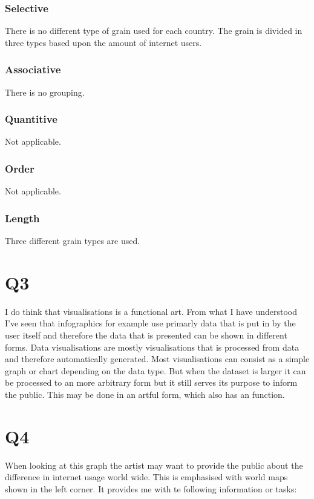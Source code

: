 \documentclass[11pt,a4paper]{article}
\begin{document}
\subsubsection{Selective}
There is no different type of grain used for each country. The grain is divided in three types based upon the amount of internet users. 
\subsubsection{Associative}
There is no grouping.
\subsubsection{Quantitive}
Not applicable.
\subsubsection{Order}
Not applicable.
\subsubsection{Length}
Three different grain types are used.

\section{Q3}
I do think that visualisations is a functional art. From what I have understood I've seen that infographics for example use primarly data that is put in by the user itself and therefore the data that is presented can be shown in different forms. Data visualisations are mostly visualisations that is processed from data and therefore automatically generated. Most visualisations can consist as a simple graph or chart depending on the data type. But when the dataset is larger it can be processed to an more arbitrary form but it still serves its purpose to inform the public. This may be done in an artful form, which also has an function.

\section{Q4}
When looking at this graph the artist may want to provide the public about the difference in internet usage world wide. This is emphasised with  world maps shown in the left corner. It provides me with te following information or tasks:
\end{document}
